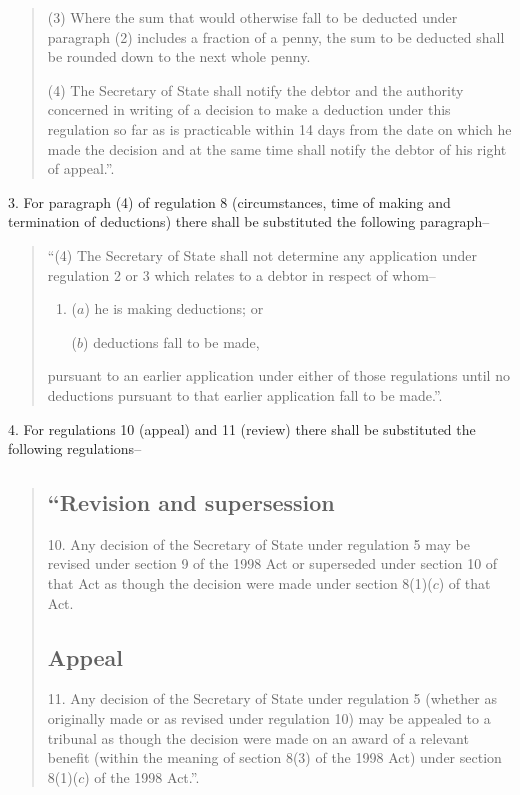 \documentclass[12pt,a4paper]{article}
\begin{document}
\begin{quotation}
(3) Where the sum that would otherwise fall to be deducted under paragraph (2) includes a fraction of a penny, the sum to be deducted shall be rounded down to the next whole penny.

(4) The Secretary of State shall notify the debtor and the authority concerned in writing of a decision to make a deduction under this regulation so far as is practicable within 14 days from the date on which he made the decision and at the same time shall notify the debtor of his right of appeal.”.
\end{quotation}

\medskip

3.  For paragraph (4) of regulation 8 (circumstances, time of making and termination of deductions) there shall be substituted the following paragraph–
\begin{quotation}
“(4) The Secretary of State shall not determine any application under regulation 2 or 3 which relates to a debtor in respect of whom–
\begin{enumerate}\item[]
($a$) he is making deductions; or

($b$) deductions fall to be made,
\end{enumerate}
pursuant to an earlier application under either of those regulations until no deductions pursuant to that earlier application fall to be made.”.
\end{quotation}

\medskip

4.  For regulations 10 (appeal) and 11 (review) there shall be substituted the following regulations–
\begin{quotation}
\subsection*{“Revision and supersession}

10.  Any decision of the Secretary of State under regulation 5 may be revised under section 9 of the 1998 Act or superseded under section 10 of that Act as though the decision were made under section 8(1)($c$)  of that Act.

\subsection*{Appeal}

11.  Any decision of the Secretary of State under regulation 5 (whether as originally made or as revised under regulation 10) may be appealed to a tribunal as though the decision were made on an award of a relevant benefit (within the meaning of section 8(3) of the 1998 Act) under section 8(1)($c$)  of the 1998 Act.”.
\end{quotation}
\end{document}
